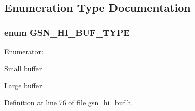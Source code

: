 \subsection{Enumeration Type Documentation}
\hypertarget{a00505_af1aed68d5f6d2f9a744d8de12b9adbbe}{
\subsubsection[{GSN\_\-HI\_\-BUF\_\-TYPE}]{\setlength{\rightskip}{0pt plus 5cm}enum {\bf GSN\_\-HI\_\-BUF\_\-TYPE}}}
\label{a00505_af1aed68d5f6d2f9a744d8de12b9adbbe}
\begin{Desc}
\item[Enumerator: ]\par
\begin{description}
\item[{\em 
\hypertarget{a00505_af1aed68d5f6d2f9a744d8de12b9adbbea52d186a62d72e859badbc83f426dd566}{
GSN\_\-HI\_\-BUF\_\-TYPE\_\-SMALL}
\label{a00505_af1aed68d5f6d2f9a744d8de12b9adbbea52d186a62d72e859badbc83f426dd566}
}]Small buffer \item[{\em 
\hypertarget{a00505_af1aed68d5f6d2f9a744d8de12b9adbbea53a7c87871450313e72c37988bd04544}{
GSN\_\-HI\_\-BUF\_\-TYPE\_\-LARGE}
\label{a00505_af1aed68d5f6d2f9a744d8de12b9adbbea53a7c87871450313e72c37988bd04544}
}]Large buffer \end{description}
\end{Desc}



Definition at line 76 of file gsn\_\-hi\_\-buf.h.



